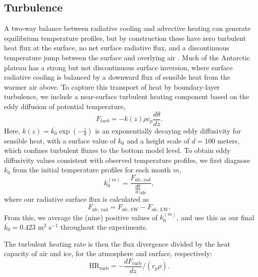 \documentclass[draft]{agujournal2019}
\begin{document}
\subsection{Turbulence}
A two-way balance between radiative cooling and advective heating can generate equilibrium temperature profiles, but by construction these have zero turbulent heat flux at the surface, no net surface radiative flux, and a discontinuous temperature jump between the surface and overlying air \cite{cronin_analytic_2016} . Much of the Antarctic plateau has a strong but not discontinuous surface inversion, where surface radiative cooling is balanced by a downward flux of sensible heat from the warmer air above. To capture this transport of heat by boundary-layer turbulence, we include a near-surface turbulent heating component based on the eddy diffusion of potential temperature,
\begin{equation}
    F_{turb} = -k(z) \rho c_p \frac{d\theta}{dz}.
\end{equation}
Here, $k(z) = \overline{k_0} \exp(-\frac{z}{d})$ is an exponentially decaying eddy diffusivity for sensible heat, with a surface value of $k_0$ and a height scale of $d = 100$ meters, which confines turbulent fluxes to the bottom  model level. To obtain eddy diffusivity values consistent with observed temperature profiles, we first diagnose $k_0$ from the initial temperature profiles for each month $m$,
\begin{equation}
    k_0^{(m)} = \frac{F_{\text{sfc, rad}}}{\frac{d\theta}{dz}_{\text{sfc}}},
\end{equation}
where our radiative surface flux is calculated as
\begin{equation}
    F_{\text{sfc, rad}} = F_{\text{sfc, SW}} - F_{\text{sfc, LW}}.
\end{equation}
From this, we average the (nine) positive values of $k_0^{(m)}$, and use this as our final $\overline{k_0} = 0.423$ m$^{2}$ s$^{-1}$ throughout the experiments.

The turbulent heating rate is then the flux divergence divided by the heat capacity of air and ice, for the atmosphere and surface, respectively:
\begin{equation}
    \text{HR}_{\text{turb}} = -\frac{dF_{\text{turb}}}{dz} /(c_p \rho).
\end{equation}
\end{document}
